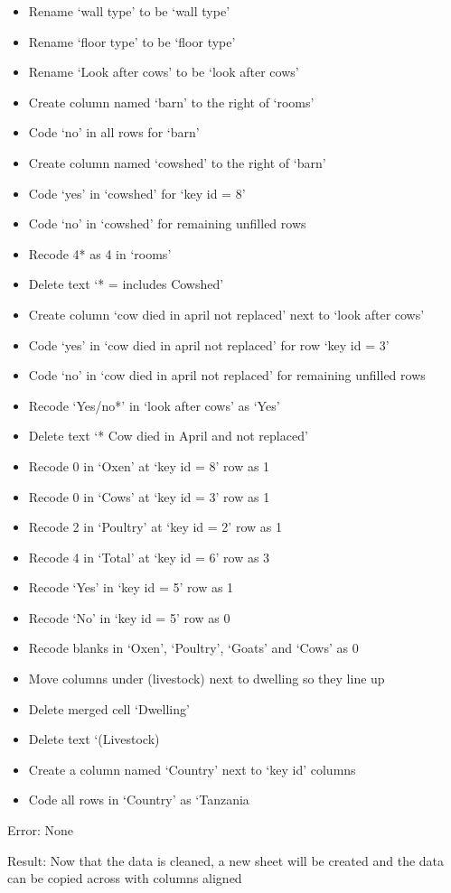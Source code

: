 \documentclass{article}
\begin{document}
\begin{itemize}
\item Rename ‘wall type’ to be ‘wall type’
\item Rename ‘floor type’ to be ‘floor type’
\item Rename ‘Look after cows’ to be ‘look after cows’
\item Create column named ‘barn’ to the right of ‘rooms’
\item Code ‘no’ in all rows for ‘barn’
\item Create column named ‘cowshed’ to the right of ‘barn’
\item Code ‘yes’ in ‘cowshed’ for ‘key id = 8’
\item Code ‘no’ in ‘cowshed’ for remaining unfilled rows
\item Recode 4* as 4 in ‘rooms’
\item Delete text ‘* = includes Cowshed’
\item Create column ‘cow died in april not replaced’ next to ‘look after cows’
\item Code ‘yes’ in ‘cow died in april not replaced’ for row ‘key id = 3’
\item Code ‘no’ in ‘cow died in april not replaced’ for remaining unfilled rows
\item Recode ‘Yes/no*’ in ‘look after cows’ as ‘Yes’
\item Delete text ‘* Cow died in April and not replaced’
\item Recode 0 in ‘Oxen’ at ‘key id = 8’ row as 1
\item Recode 0 in ‘Cows’ at ‘key id = 3’ row as 1
\item Recode 2 in ‘Poultry’ at ‘key id = 2’ row as 1
\item Recode 4 in ‘Total’ at ‘key id = 6’ row as 3
\item Recode ‘Yes’ in ‘key id = 5’ row as 1
\item Recode ‘No’ in ‘key id = 5’ row as 0
\item Recode blanks in ‘Oxen’, ‘Poultry’, ‘Goats’ and ‘Cows’ as 0
\item Move columns under (livestock) next to dwelling so they line up
\item Delete merged cell ‘Dwelling’
\item Delete text ‘(Livestock)
\item Create a column named ‘Country’ next to ‘key id’ columns
\item Code all rows in ‘Country’ as ‘Tanzania
\end{itemize}
Error: None \par
Result: Now that the data is cleaned, a new sheet will be created and the data can be copied across with columns aligned 
\end{document}
